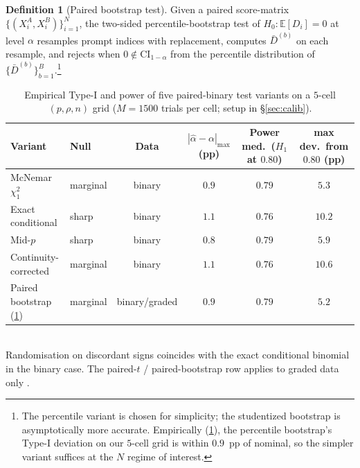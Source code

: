 \documentclass{article}
\theoremstyle{plain}
\theoremstyle{definition}
\newtheorem{definition}{Definition}
\begin{document}
\begin{definition}[Paired bootstrap test]
\label{def:bpow}
Given a paired score-matrix $\{(X^A_i,X^B_i)\}_{i=1}^N$, the two-sided percentile-bootstrap test of $H_0: \mathbb{E}[D_i]=0$ at level $\alpha$ resamples prompt indices with replacement, computes $\bar D^{(b)}$ on each resample, and rejects when $0 \notin \mathrm{CI}_{1-\alpha}$ from the percentile distribution of $\{\bar D^{(b)}\}_{b=1}^B$.\footnote{The percentile variant is chosen for simplicity; the studentized bootstrap \citep[Ch.~3]{hall1992bootstrap} is asymptotically more accurate. Empirically (\cref{tab:variants}), the percentile bootstrap's Type-I deviation on our $5$-cell grid is within $0.9$~pp of nominal, so the simpler variant suffices at the $N$ regime of interest.}
\end{definition}

\begin{table}[t]
\caption{Empirical Type-I and power of five paired-binary test variants on a $5$-cell $(p,\rho,n)$ grid ($M{=}1500$ trials per cell; setup in \S\ref{sec:calib}).}
\label{tab:variants}
\centering\small
\setlength{\tabcolsep}{5pt}
\begin{tabular}{@{}llcccc@{}}
\toprule
Variant & Null & Data & $|\hat\alpha{-}\alpha|_{\max}$ (pp) & Power med.\ ($H_1$ at $0.80$) & max dev.\ from $0.80$ (pp) \\
\midrule
McNemar $\chi^2_1$        & marginal & binary        & $0.9$ & $0.79$ & $5.3$ \\
Exact conditional         & sharp    & binary        & $1.1$ & $0.76$ & $10.2$ \\
Mid-$p$                    & sharp    & binary        & $0.8$ & $0.79$ & $5.9$ \\
Continuity-corrected      & marginal & binary        & $1.1$ & $0.76$ & $10.6$ \\
Paired bootstrap (\cref{def:bpow})    & marginal & binary/graded & $0.9$ & $0.79$ & $5.2$ \\
\bottomrule
\end{tabular}
\\[2pt]
{\footnotesize Randomisation on discordant signs coincides with the exact conditional binomial in the binary case. The paired-$t$ / paired-bootstrap row applies to graded data only \citep{efron1993bootstrap,hall1992bootstrap}.}
\end{table}
\end{document}
